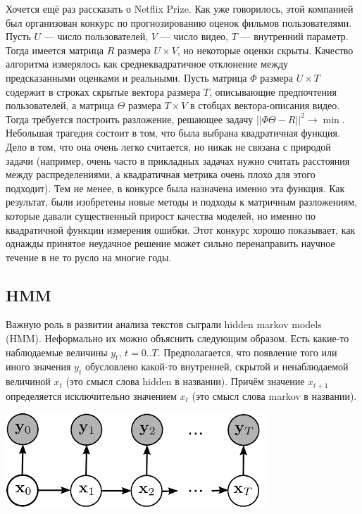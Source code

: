\documentclass[a4paper,14pt]{extarticle}
\begin{document}
Хочется ещё раз рассказать о Netflix Prize. Как уже говорилось, этой компанией был организован конкурс по прогнозированию оценок фильмов пользователями. Пусть $U$ --- число пользователей, $V$ --- число видео, $T$ --- внутренний параметр. Тогда имеется матрица $R$ размера $U \times V$, но некоторые оценки скрыты. Качество алгоритма измерялось как среднеквадратичное отклонение между предсказанными оценками и реальными. Пусть матрица $\Phi$ размера $U \times T$ содержит в строках скрытые вектора размера $T$, описывающие предпочтения пользователей, а матрица $\Theta$ размера $T \times V$ в стобцах вектора-описания видео. Тогда требуется построить разложение, решающее задачу $||\Phi \Theta - R||^2 \to \min$. Небольшая трагедия состоит в том, что была выбрана квадратичная функция. Дело в том, что она очень легко считается, но никак не связана с природой задачи (например, очень часто в прикладных задачах нужно считать расстояния между распределениями, а квадратичная метрика очень плохо для этого подходит). Тем не менее, в конкурсе была назначена именно эта функция. Как результат, были изобретены новые методы и подходы к матричным разложениям, которые давали существенный прирост качества моделей, но именно по квадратичной функции измерения ошибки. Этот конкурс хорошо показывает, как однажды принятое неудачное решение может сильно перенаправить научное течение в не то русло на многие годы.

\subsection{HMM}
Важную роль в развитии анализа текстов сыграли hidden markov models (HMM). Неформально их можно объяснить следующим образом. Есть какие-то наблюдаемые величины $y_t$, $t = 0..T$. Предполагается, что появление того или иного значения $y_t$ обусловлено какой-то внутренней, скрытой и ненаблюдаемой величиной $x_t$ (это смысл слова hidden в названии). Причём значение $x_{t+1}$ определяется исключительно значением $x_t$ (это смысл слова markov в названии).

\medskip

\includegraphics[width=1.0\linewidth]{hmm.png}
\end{document}

